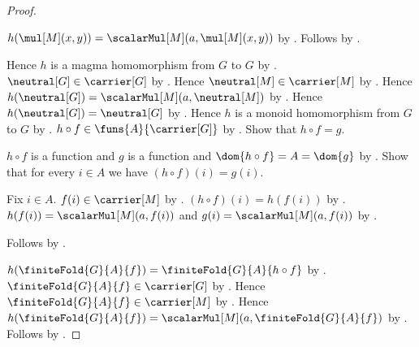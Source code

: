 \begin{proof}
\begin{subproof}
        $h(\mul[M](x,y))
            =\scalarMul[M](a,\mul[M](x,y))$ by
            .
        Follows by
            .
    \end{subproof}
    Hence $h$ is a magma homomorphism from $G$ to $G$ by
        .
    $\neutral[G]\in\carrier[G]$ by
        .
    Hence $\neutral[M]\in\carrier[M]$ by
        .
    Hence $h(\neutral[G])=\scalarMul[M](a,\neutral[M])$ by
        .
    Hence $h(\neutral[G])=\neutral[G]$ by
        .
    Hence $h$ is a monoid homomorphism from $G$ to $G$ by
        .
    $h\circ f\in\funs{A}{\carrier[G]}$ by
        .
    Show that $h\circ f=g$.
    \begin{subproof}
        $h\circ f$ is a function and $g$ is a function and
            $\dom{h\circ f}=A=\dom{g}$ by
            .
        Show that for every $i\in A$ we have $(h\circ f)(i)=g(i)$.
        \begin{subproof}
            Fix $i\in A$.
            $f(i)\in\carrier[M]$ by .
            $(h\circ f)(i)=h(f(i))$ by
                .
            $h(f(i))=\scalarMul[M](a,f(i))$ and
                $g(i)=\scalarMul[M](a,f(i))$ by
                .
        \end{subproof}
        Follows by .
    \end{subproof}
    $h(\finiteFold{G}{A}{f})
        =\finiteFold{G}{A}{h\circ f}$ by
        .
    $\finiteFold{G}{A}{f}\in\carrier[G]$ by
        .
    Hence $\finiteFold{G}{A}{f}\in\carrier[M]$ by
        .
    Hence
        $h(\finiteFold{G}{A}{f})
            =\scalarMul[M](a,\finiteFold{G}{A}{f})$ by
        .
    Follows by .
\end{proof}
